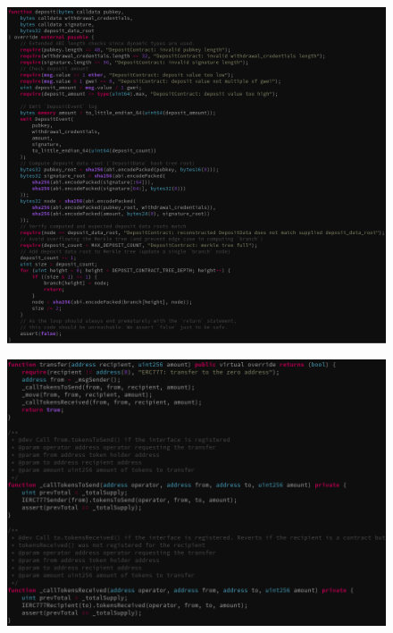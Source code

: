 \documentclass[aspectratio=169,10pt]{beamer}
\begin{document}
\begin{frame}[fragile]
\begin{center}
\begin{figure}
	\includegraphics[scale=0.25]{images/deposit_pass}
\end{figure}
\end{center}
\end{frame}

\begin{frame}[fragile]
\begin{center}
\begin{figure}
	\includegraphics[scale=0.25]{images/erc777_fail}
\end{figure}
\end{center}
\end{frame}
\end{document}
